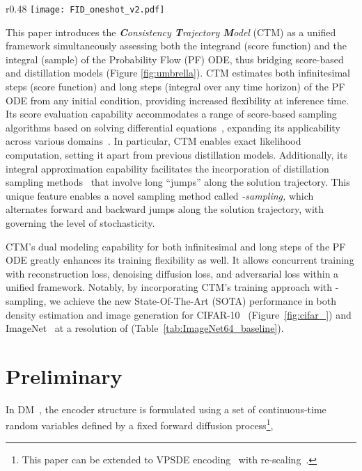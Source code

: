 \documentclass{article} \usepackage{iclr2024_coNFErence,times}
\theoremstyle{definition}
\theoremstyle{remark}
\begin{document}
\begin{wrapfigure}{r}{0.48\textwidth}
	\vskip -0.2in
	\centering
		\centering		\texttt{[image: FID\_oneshot\_v2.pdf]}
        \vskip -0.1in
 \caption{SOTA on CIFAR-10. Closeness to the origin indicates better performance.}
	\label{fig:cifar_}
 \vskip -0.1in
\end{wrapfigure}
This paper introduces the \emph{\textbf{C}onsistency \textbf{T}rajectory \textbf{M}odel} (CTM) as a unified framework simultaneously assessing both the integrand (score function) and the integral (sample) of the Probability Flow (PF) ODE, thus bridging score-based and distillation models (Figure \ref{fig:umbrella}). CTM estimates both infinitesimal steps (score function) and long steps (integral over any time horizon) of the PF ODE from any initial condition, providing increased  flexibility at inference time. Its score evaluation capability accommodates a range of score-based sampling algorithms based on  solving differential equations~\citep{song2020score}, expanding its applicability across various domains~\citep{saharia2022palette}. In particular, CTM enables exact likelihood computation, setting it apart from previous distillation models. 
Additionally, its integral approximation capability facilitates the incorporation of distillation sampling methods~\citep{salimans2021progressive,song2023consistency} that involve long ``jumps'' along the solution trajectory. This unique feature enables a novel sampling method called \emph{-sampling,} which alternates forward and backward jumps along the solution trajectory, with  governing the level of stochasticity.


CTM's dual modeling capability for both infinitesimal and long steps of the PF ODE greatly enhances its training flexibility as well. It allows concurrent training with reconstruction loss, denoising diffusion loss, and adversarial loss within a unified framework. Notably, by incorporating CTM's training approach with -sampling, we achieve the new State-Of-The-Art (SOTA) performance in both density estimation and image generation for CIFAR-10~\citep{krizhevsky2009learning} (Figure~\ref{fig:cifar_}) and ImageNet~\citep{russakovsky2015imagenet} at a resolution of  (Table~\ref{tab:ImageNet64_baseline}).


\section{Preliminary}\label{sec:preliminary}

In DM~\citep{sohl2015deep,song2020score}, the encoder structure is formulated using a set of continuous-time random variables defined by a fixed forward diffusion process\footnote{This paper can be extended to VPSDE encoding~\citep{song2020score} with re-scaling~\citep{kim2022refining}.}, 
\end{document}
